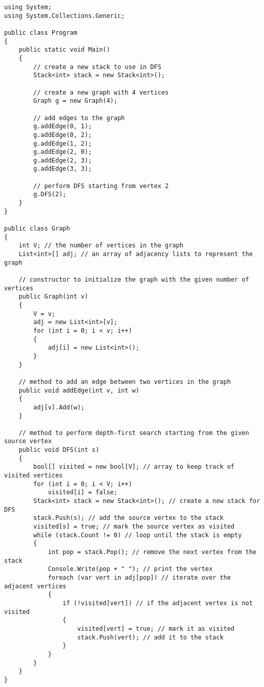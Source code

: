 \documentclass[12pt, titlepage, a4paper]{article}
\begin{document}
\begin{lstlisting}
using System;
using System.Collections.Generic;

public class Program
{
    public static void Main()
    {
        // create a new stack to use in DFS
        Stack<int> stack = new Stack<int>();

        // create a new graph with 4 vertices
        Graph g = new Graph(4);

        // add edges to the graph
        g.addEdge(0, 1);
        g.addEdge(0, 2);
        g.addEdge(1, 2);
        g.addEdge(2, 0);
        g.addEdge(2, 3);
        g.addEdge(3, 3);

        // perform DFS starting from vertex 2
        g.DFS(2);
    }
}

public class Graph
{
    int V; // the number of vertices in the graph
    List<int>[] adj; // an array of adjacency lists to represent the graph

    // constructor to initialize the graph with the given number of vertices
    public Graph(int v)
    {
        V = v;
        adj = new List<int>[v];
        for (int i = 0; i < v; i++)
        {
            adj[i] = new List<int>();
        }
    }

    // method to add an edge between two vertices in the graph
    public void addEdge(int v, int w)
    {
        adj[v].Add(w);
    }

    // method to perform depth-first search starting from the given source vertex
    public void DFS(int s)
    {
        bool[] visited = new bool[V]; // array to keep track of visited vertices
        for (int i = 0; i < V; i++)
            visited[i] = false;
        Stack<int> stack = new Stack<int>(); // create a new stack for DFS
        stack.Push(s); // add the source vertex to the stack
        visited[s] = true; // mark the source vertex as visited
        while (stack.Count != 0) // loop until the stack is empty
        {
            int pop = stack.Pop(); // remove the next vertex from the stack
            Console.Write(pop + " "); // print the vertex
            foreach (var vert in adj[pop]) // iterate over the adjacent vertices
            {
                if (!visited[vert]) // if the adjacent vertex is not visited
                {
                    visited[vert] = true; // mark it as visited
                    stack.Push(vert); // add it to the stack
                }
            }
        }
    }
}
\end{lstlisting}
~\cite{GeeksforGeeks: DFS}
\clearpage
\end{document}
